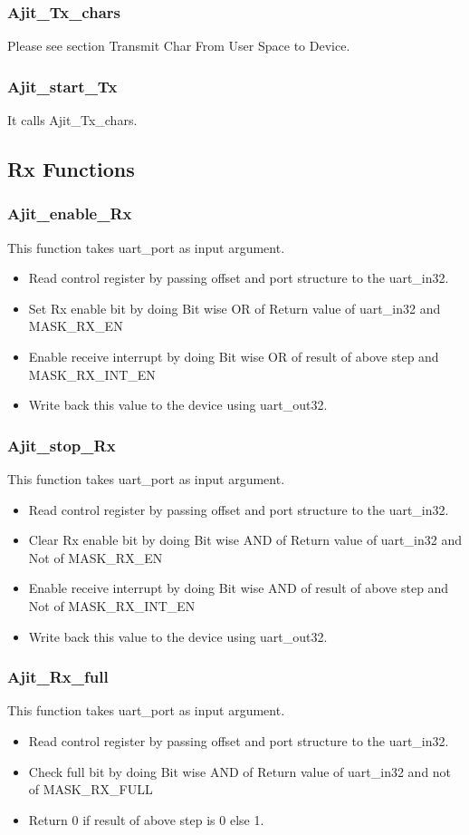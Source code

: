 \documentclass[12pt,a4paper]{article}
\begin{document}
\subsubsection{Ajit\_Tx\_chars}
Please see section Transmit Char From User Space to Device.
\subsubsection{Ajit\_start\_Tx}
It calls Ajit\_Tx\_chars.
\subsection{Rx Functions}
\subsubsection{Ajit\_enable\_Rx}
This function takes uart\_port as input argument.
\begin{itemize}
\item Read control register by passing offset and port structure to the uart\_in32. 
\item Set Rx enable bit by doing Bit wise OR of Return value of uart\_in32 and MASK\_RX\_EN 
\item Enable receive interrupt  by doing Bit wise OR of result of above step and MASK\_RX\_INT\_EN
\item Write back this value to the device using uart\_out32.  
\end{itemize}
\subsubsection{Ajit\_stop\_Rx}
This function takes uart\_port as input argument.
\begin{itemize}
\item Read control register by passing offset and port structure to the uart\_in32. 
\item Clear Rx enable bit by doing Bit wise AND of Return value of uart\_in32 and Not of MASK\_RX\_EN 
\item Enable receive interrupt  by doing Bit wise AND of result of above step and Not of MASK\_RX\_INT\_EN
\item Write back this value to the device using uart\_out32.  
\end{itemize}
\subsubsection{Ajit\_Rx\_full}
This function takes uart\_port as input argument.
\begin{itemize}
\item Read control register by passing offset and port structure to the uart\_in32. 
\item Check full bit by doing Bit wise AND of Return value of uart\_in32 and not of MASK\_RX\_FULL
\item Return 0 if result of above step is 0 else 1.
\end{itemize}
\end{document}
